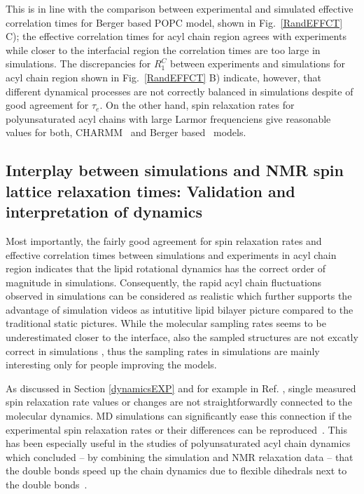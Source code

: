 \documentclass[aps,prl,superscriptaddress,twocolumn]{revtex4}
\begin{document}
This is in line with the comparison between experimental and simulated effective correlation times for Berger
based POPC model, shown in Fig.~\ref{RandEFFCT} C); the effective correlation times for acyl chain region agrees 
with experiments while closer to the interfacial region the correlation times are too large in simulations. 
The discrepancies for $R_1^{C}$ between experiments and simulations for acyl chain region shown in Fig.~\ref{RandEFFCT} B)
indicate, however, that different dynamical processes are not correctly balanced in simulations despite of good
agreement for $\tau_e$.  On the other hand, spin relaxation rates for polyunsaturated acyl chains
with large Larmor frequenciens give reasonable values for both, CHARMM~\cite{eldho03,klauda12} and Berger 
based~\cite{ollila07a} models.




\subsection{Interplay between simulations and NMR spin lattice relaxation times: Validation and interpretation of dynamics}

Most importantly, the fairly good agreement for spin relaxation rates and effective correlation times between 
simulations and experiments in acyl chain region indicates that the lipid rotational dynamics has the 
correct order of magnitude in simulations. Consequently, the rapid acyl chain fluctuations observed in 
simulations can be considered as realistic which further supports the advantage of simulation videos as 
intutitive lipid bilayer picture compared to the traditional static pictures. While the molecular sampling rates 
seems to be underestimated closer to the interface, also the sampled structures are not excatly correct
in simulations \cite{botan15}, thus the sampling rates in simulations are mainly interesting only for people 
improving the models. 

As discussed in Section \ref{dynamicsEXP} and for example in Ref. \cite{ferreira15},
single measured spin relaxation rate values or changes are not straightforwardly connected
to the molecular dynamics. MD simulations can significantly ease this connection if the
experimental spin relaxation rates or their differences can be reproduced~\cite{feller02,eldho03,nowacka13}.
This has been especially useful in the studies of polyunsaturated acyl chain dynamics which concluded --
by combining the simulation and NMR relaxation data -- that the double bonds speed up the chain dynamics
due to flexible dihedrals next to the double bonds~\cite{feller02,eldho03,gawrisch03,stillwell03}.
\end{document}
